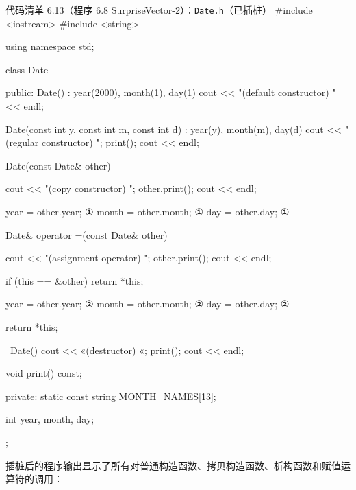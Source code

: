\begin{codeboxt}{代码清单 6.13（程序 6.8 SurpriseVector-2）：\texttt{Date.h}（已插桩）}
#include <iostream>
#include <string>

using namespace std;

class Date
{
public:
    Date() : year(2000), month(1), day(1)
    {
        cout << "(default constructor) " << endl;
    }

    Date(const int y, const int m, const int d)
        : year(y), month(m), day(d)
    {
        cout << "(regular constructor) "; print(); cout << endl;
    }

    Date(const Date& other)
    {
        cout << "(copy constructor) "; other.print(); cout << endl;

        year  = other.year;       ①
        month = other.month;      ①
        day   = other.day;        ①
    }

    Date& operator =(const Date& other)
    {
        cout << "(assignment operator) "; other.print();
        cout << endl;

        if (this == &other) return *this;

        year  = other.year;       ②
        month = other.month;      ②
        day   = other.day;        ②

        return *this;
    }

    ~Date()
    {
        cout << «(destructor) «; print(); cout << endl;
    }

    void print() const;

private:
    static const string MONTH_NAMES[13];

    int year, month, day;
};
\end{codeboxt}
\par
{}\par

插桩后的程序输出显示了所有对普通构造函数、拷贝构造函数、析构函数和赋值运算符的调用：

